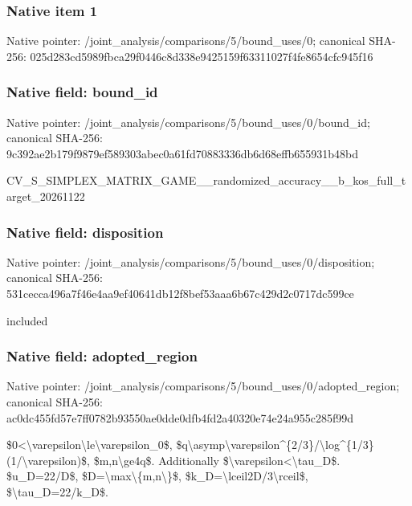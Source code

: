 \documentclass[10pt,a4paper]{article}
\begin{document}
\subsubsection{Native item 1}


Native pointer: /joint\_analysis/comparis\allowbreak{}ons/5/bound\_uses/0; canonical SHA-256: 025d283cd5989fbca29f0446\allowbreak{}c8d338e9425159f63311027f\allowbreak{}4fe8654cfc945f16



\subsubsection{Native field: bound\_id}


Native pointer: /joint\_analysis/comparis\allowbreak{}ons/5/bound\_uses/0/bound\allowbreak{}\_id; canonical SHA-256: 9c392ae2b179f9879ef58930\allowbreak{}3abec0a61fd70883336db6d6\allowbreak{}8effb655931b48bd


CV\_S\_SIMPLEX\_MATRIX\_GAME\allowbreak{}\_\_randomized\_accuracy\_\_b\allowbreak{}\_kos\_full\_target\_2026112\allowbreak{}2


\subsubsection{Native field: disposition}


Native pointer: /joint\_analysis/comparis\allowbreak{}ons/5/bound\_uses/0/dispo\allowbreak{}sition; canonical SHA-256: 531cecca496a7f46e4aa9ef4\allowbreak{}0641db12f8bef53aaa6b67c4\allowbreak{}29d2c0717dc599ce


included


\subsubsection{Native field: adopted\_region}


Native pointer: /joint\_analysis/comparis\allowbreak{}ons/5/bound\_uses/0/adopt\allowbreak{}ed\_region; canonical SHA-256: ac0dc455fd57e7ff0782b935\allowbreak{}50ae0dde0dfb4fd2a40320e7\allowbreak{}4e24a955c285f99d


\$0<\textbackslash{}varepsilon\textbackslash{}le\textbackslash{}varepsilon\_0\$, \$q\textbackslash{}asymp\textbackslash{}varepsilon\textasciicircum{}\{2/\allowbreak{}3\}/\textbackslash{}log\textasciicircum{}\{1/3\}(1/\textbackslash{}varepsi\allowbreak{}lon)\$, \$m,n\textbackslash{}ge4q\$. Additionally \$\textbackslash{}varepsilon<\textbackslash{}tau\_D\$. \$u\_D=22/D\$, \$D=\textbackslash{}max\textbackslash{}\{m,n\textbackslash{}\}\$, \$k\_D=\textbackslash{}lceil2D/3\textbackslash{}rceil\$, \$\textbackslash{}tau\_D=22/k\_D\$.
\end{document}
